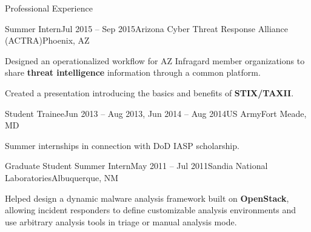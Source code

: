 
\begin{rSection}{Professional Experience}


\begin{rExperienceBullets}{Summer Intern}{Jul 2015 -- Sep 2015}{Arizona Cyber Threat Response Alliance (ACTRA)}{Phoenix, AZ}

  \item Designed an operationalized workflow for AZ Infragard member organizations to share {\bf threat intelligence} information through a common platform.

  \item Created a presentation introducing the basics and benefits of {\bf STIX/TAXII}.

\end{rExperienceBullets}


\begin{rExperienceBullets}{Student Trainee}{Jun 2013 -- Aug 2013, Jun 2014 -- Aug 2014}{US Army}{Fort Meade, MD}

  \item Summer internships in connection with DoD IASP scholarship.

\end{rExperienceBullets}


\begin{rExperienceBullets}{Graduate Student Summer Intern}{May 2011 -- Jul 2011}{Sandia National Laboratories}{Albuquerque, NM}

  \item Helped design a dynamic malware analysis framework built on \textbf{OpenStack}, allowing incident responders to define customizable analysis environments and use arbitrary analysis tools in triage or manual analysis mode.



\end{rExperienceBullets}
\end{rSection}
